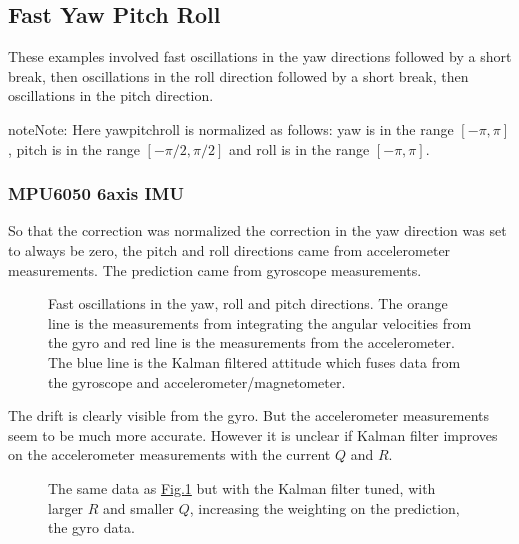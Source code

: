 \documentclass[letterpaper,10pt,english]{jupyterBook}
\begin{document}
\subsection{Fast Yaw Pitch Roll}
\label{\detokenize{7RealData:fast-yaw-pitch-roll}}
\sphinxAtStartPar
These examples involved fast oscillations in the yaw directions followed by a short break, then oscillations in the roll direction followed by a short break, then oscillations in the pitch direction.

\begin{sphinxadmonition}{note}{Note:}
\sphinxAtStartPar
Here yaw\sphinxhyphen{}pitch\sphinxhyphen{}roll is normalized as follows: yaw is in the range \([-\pi, \pi]\), pitch is in the range \([-\pi/2, \pi/2]\) and roll is in the range \([-\pi, \pi]\).
\end{sphinxadmonition}


\subsubsection{MPU6050 6\sphinxhyphen{}axis IMU}
\label{\detokenize{7RealData:mpu6050-6-axis-imu}}
\sphinxAtStartPar
So that the correction was normalized the correction in the yaw direction was set to always be zero, the pitch and roll directions came from accelerometer measurements. The prediction came from gyroscope measurements.

\begin{figure}[htbp]
\centering
\capstart

\noindent{}
\caption{Fast oscillations in the yaw, roll and pitch directions. The orange line is the measurements from integrating the angular velocities from the gyro and red line is the measurements from the accelerometer. The blue line is the Kalman filtered attitude which fuses data from the gyroscope and accelerometer/magnetometer.}\label{\detokenize{7RealData:fig-fast-yaw-roll-pitch-6-axis}}\end{figure}

\sphinxAtStartPar
The drift is clearly visible from the gyro. But the accelerometer measurements seem to be much more accurate. However it is unclear if Kalman filter improves on the accelerometer measurements with the current \(Q\) and \(R\).

\begin{figure}[htbp]
\centering
\capstart

\noindent{}
\caption{The same data as \hyperref[\detokenize{7RealData:fig-fast-yaw-roll-pitch-6-axis}]{Fig.\@ \ref{\detokenize{7RealData:fig-fast-yaw-roll-pitch-6-axis}}} but with the Kalman filter tuned, with larger \(R\) and smaller \(Q\), increasing the weighting on the prediction, the gyro data.}\label{\detokenize{7RealData:fig-fast-yaw-roll-pitch-6-axis-tuned}}\end{figure}
\end{document}
